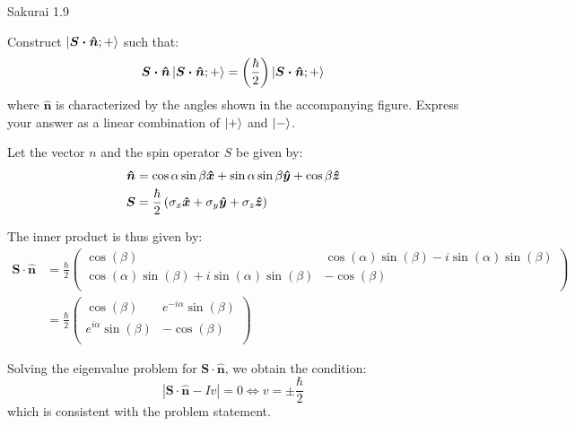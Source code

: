 \documentclass{article}
\begin{document}
	\newpage
	\begin{section}{Sakurai 1.9}
		\newcommand{\sdotn}{\boldsymbol{S \cdot \hat{n}}}
		\newcommand{\sdotnplus}{\ket{\sdotn; +}}

		Construct $\sdotnplus$ such that:
		\begin{align*}
			\sdotn \sdotnplus = \pbracket{\frac{\hbar}{2}} \sdotnplus
		\end{align*}
		where $\boldsymbol{\hat{n}}$ is characterized by the angles shown in the accompanying figure. Express your answer as a linear combination of $\ket{+}$ and $\ket{-}$.
	
		\begin{tcolorbox}[breakable]
			Let the vector $n$ and the spin operator $S$ be given by:
			\begin{align*}
				\boldsymbol{\hat{n}} &= \cos{\alpha}\sin{\beta} \boldsymbol{\hat{x}} + \sin{\alpha}\sin{\beta} \boldsymbol{\hat{y}} + \cos{\beta} \boldsymbol{\hat{z}} \\
				\boldsymbol{S} &= \frac{\hbar}{2} \left(\sigma_x \boldsymbol{\hat{x}} + \sigma_y \boldsymbol{\hat{y}} + \sigma_z \boldsymbol{\hat{z}}\right)
			\end{align*}

			The inner product is thus given by:
			\begin{align*}
				\sdotn &= \frac{\hbar}{2} 
					\left(
					\begin{array}{cc}
					 \cos (\beta ) & \cos (\alpha ) \sin (\beta )-i \sin (\alpha ) \sin (\beta ) \\
					 \cos (\alpha ) \sin (\beta )+i \sin (\alpha ) \sin (\beta ) & -\cos (\beta ) \\
					\end{array}
					\right) \\
					&= \frac{\hbar}{2} 
					\left(
						\begin{array}{cc}
						 \cos (\beta ) & e^{-i \alpha} \sin (\beta ) \\
						 e^{i \alpha} \sin (\beta ) & -\cos (\beta ) \\
						\end{array}
					\right)
			\end{align*}

			Solving the eigenvalue problem for $\sdotn$, we obtain the condition:
			\begin{equation*}
				|\sdotn - Iv| = 0 \iff v = \pm \frac{\hbar}{2}
			\end{equation*}
			which is consistent with the problem statement.


\end{tcolorbox}
\end{section}
\end{document}
